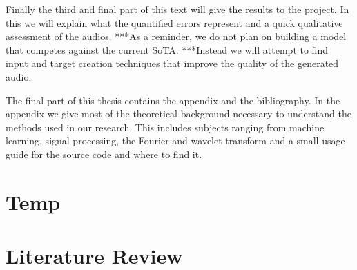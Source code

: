 \documentclass{book}
\begin{document}
\par
Finally the third and final part of this text will give the results to the project.
In this we will explain what the quantified errors represent and a quick qualitative assessment of the audios.
***As a reminder, we do not plan on building a model that competes against the current SoTA.
***Instead we will attempt to find input and target creation techniques that improve the quality of the generated audio.
\par
The final part of this thesis contains the appendix and the bibliography.
In the appendix we give most of the theoretical background necessary to understand the methods used in our research.
This includes subjects ranging from machine learning, signal processing, the Fourier and wavelet transform and a small usage guide for the source code and where to find it.

\part*{Temp}
\part{Literature Review}
\end{document}
